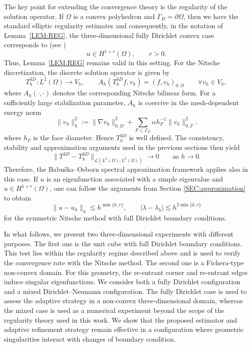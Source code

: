 \documentclass[onefignum,onetabnum,final]{siamart250211}
\numberwithin{equation}{section}
\newcommand\0{\boldsymbol{0}}
\begin{document}
The key point for extending the convergence theory is the regularity of the solution operator. If $\Omega$ is a convex polyhedron and $\Gamma_D=\partial\Omega$, then we have the standard elliptic regularity estimates and consequently, in the notation of Lemma~\ref{LEM:REG}, the three-dimensional fully
Dirichlet convex case corresponds to (see \cite{grisvard1986problemes,MR961439})
\[
   u\in H^{1+r}(\Omega),\qquad r>0.
\]
Thus, Lemma~\ref{LEM:REG} remains valid in this setting. 
For the Nitsche discretization, the discrete solution operator is given by
\[
   T_h^{3D}:L^2(\Omega)\to V_h,\qquad
   A_h(T_h^{3D} f,v_h)=(f,v_h)_{0,\Omega}\qquad \forall v_h\in V_h,
\]
where $A_h(\cdot,\cdot)$ denotes the corresponding Nitsche bilinear form. For a sufficiently large stabilization parameter, $A_h$ is coercive in the mesh-dependent energy norm
\[
   \|v_h\|_{h}^{2}
   :=
   \|\nabla v_h\|_{0,\Omega}^{2}
   +\sum_{F\subset\Gamma_D}\alpha h_F^{-1}\|v_h\|_{0,F}^{2}.
\]
where $h_F$ is the face diameter. Hence $T_h^{3D}$ is well defined. The consistency, stability and approximation arguments used in the previous sections then yield
\[
   \|T^{3D}-T_h^{3D}\|_{\mathcal{L}(L^2(\Omega),L^2(\Omega))}\to 0
   \qquad \text{as } h\to 0.
\]
Therefore, the Babu\v{s}ka--Osborn spectral approximation framework applies also in this case. If $u$ is an eigenfunction associated with a simple eigenvalue and $u\in H^{1+r}(\Omega)$, one can follow the arguments from Section \ref{SEC:approximation} to obtain
\[
   \|u-u_h\|_{h}\lesssim h^{\min\{k,r\}},
   \qquad
   |\lambda-\lambda_h|\lesssim h^{2\min\{k,r\}}
\]
for the symmetric Nitsche method with full Dirichlet boundary conditions. 

In what follows, we present two three-dimensional experiments with different purposes. The first one is the unit cube with full Dirichlet boundary conditions. This test lies within the regularity regime described above and is used to verify the convergence
rate with the Nitsche method. The second one is a Fichera-type non-convex domain. For this geometry, the re-entrant corner and re-entrant edges induce singular eigenfunctions. We consider both a fully Dirichlet configuration and a mixed Dirichlet--Neumann configuration. The fully Dirichlet case is used to assess the adaptive strategy in a non-convex three-dimensional domain, whereas the mixed case is used as a numerical experiment beyond the scope of the regularity theory used in this work. We show that the proposed estimator and adaptive refinement strategy remain effective in a configuration where geometric singularities interact with changes of boundary condition.
\end{document}
